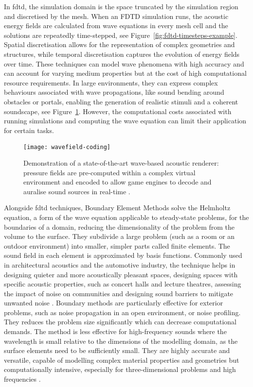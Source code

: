 In \acrshort{fdtd}, the simulation domain is the space truncated by the simulation region and discretised by the mesh. When an FDTD simulation runs, the acoustic energy fields are calculated from wave equations in every mesh cell and the solutions are repeatedly time-stepped, see Figure~\ref{fig:fdtd-timesteps-example}. Spatial discretisation allows for the representation of complex geometries and structures, while temporal discretisation captures the evolution of energy fields over time.
These techniques can model wave phenomena with high accuracy and can account for varying medium properties but at the cost of high computational resource requirements. In large environments, they can express complex behaviours associated with wave propagations, like sound bending around obstacles or portals, enabling the generation of realistic stimuli and a coherent soundscape, see Figure~\ref{fig:wavefield-coding}. However, the computational costs associated with running simulations and computing the wave equation can limit their application for certain tasks.
\begin{figure}[htbp]
    \centering
    \texttt{[image: wavefield-coding]}
    \caption[Demonstration of the parametric wavefield coding method]{Demonstration of a state-of-the-art wave-based acoustic renderer: pressure fields are pre-computed within a complex virtual environment and encoded to allow game engines to decode and auralise sound sources in real-time \citep{raghuvanshi2014parametric}.}\label{fig:wavefield-coding}
\end{figure}
Alongside \acrshort{fdtd} techniques, Boundary Element Methods solve the Helmholtz equation, a form of the wave equation applicable to steady-state problems, for the boundaries of a domain, reducing the dimensionality of the problem from the volume to the surface. They subdivide a large problem (such as a room or an outdoor environment) into smaller, simpler parts called finite elements. The sound field in each element is approximated by basis functions. Commonly used in architectural acoustics and the automotive industry, the technique helps in designing quieter and more acoustically pleasant spaces, designing spaces with specific acoustic properties, such as concert halls and lecture theatres, assessing the impact of noise on communities and designing sound barriers to mitigate unwanted noise \citep{gumerov2021fast}.
Boundary methods are particularly effective for exterior problems, such as noise propagation in an open environment, or noise profiling.
They reduces the problem size significantly which can decrease computational demands.
The method is less effective for high-frequency sounds where the wavelength is small relative to the dimensions of the modelling domain, as the surface elements need to be sufficiently small. They are highly accurate and versatile, capable of modelling complex material properties and geometries but computationally intensive, especially for three-dimensional problems and high frequencies \citep{kirkup2019boundary}.


